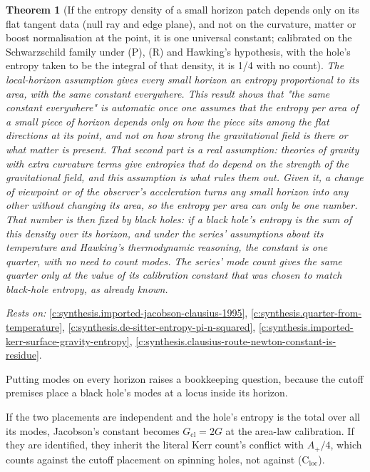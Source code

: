 \documentclass[11pt]{article}
\newtheorem{theorem}{Theorem}[section]
\theoremstyle{definition}
\theoremstyle{plain}
\begin{document}
\begin{theorem}[If the entropy density of a small horizon patch depends only on its flat tangent data (null ray and edge plane), and not on the curvature, matter or boost normalisation at the point, it is one universal constant; calibrated on the Schwarzschild family under (P), (R) and Hawking's hypothesis, with the hole's entropy taken to be the integral of that density, it is 1/4 with no count]\label{c:synthesis.c-loc-entropy-clause-curvature-independent-density}
The local-horizon assumption gives every small horizon an entropy proportional to its area, with the same constant everywhere. This result shows that "the same constant everywhere" is automatic once one assumes that the entropy per area of a small piece of horizon depends only on how the piece sits among the flat directions at its point, and not on how strong the gravitational field is there or what matter is present. That second part is a real assumption: theories of gravity with extra curvature terms give entropies that do depend on the strength of the gravitational field, and this assumption is what rules them out. Given it, a change of viewpoint or of the observer's acceleration turns any small horizon into any other without changing its area, so the entropy per area can only be one number. That number is then fixed by black holes: if a black hole's entropy is the sum of this density over its horizon, and under the series' assumptions about its temperature and Hawking's thermodynamic reasoning, the constant is one quarter, with no need to count modes. The series' mode count gives the same quarter only at the value of its calibration constant that was chosen to match black-hole entropy, as already known.
\end{theorem}
\noindent\emph{Rests on:} \ref{c:synthesis.imported-jacobson-clausius-1995}, \ref{c:synthesis.quarter-from-temperature}, \ref{c:synthesis.de-sitter-entropy-pi-n-squared}, \ref{c:synthesis.imported-kerr-surface-gravity-entropy}, \ref{c:synthesis.clausius-route-newton-constant-is-residue}.

Putting modes on every horizon raises a bookkeeping question, because the cutoff premises place a black hole's modes at a locus inside its horizon.

If the two placements are independent and the hole's entropy is the total over all its modes, Jacobson's constant becomes $G_{\mathrm{cl}} = 2G$ at the area-law calibration. If they are identified, they inherit the literal Kerr count's conflict with $A_{+}/4$, which counts against the cutoff placement on spinning holes, not against (C$_{\mathrm{loc}}$).
\end{document}
